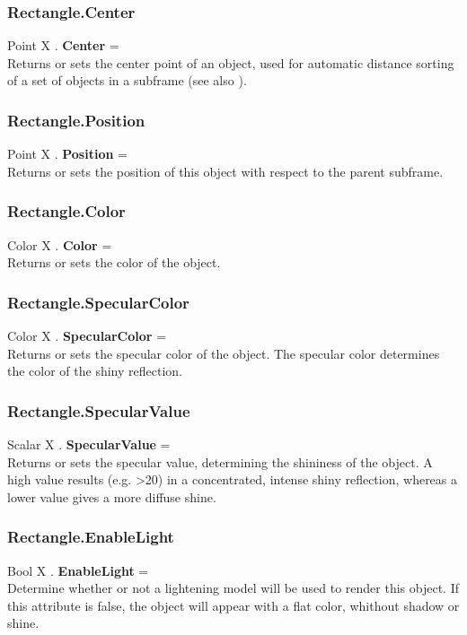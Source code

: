 \subsubsection{Rectangle.Center \label{F:Rectangle:Center}}
Point X . \textbf{Center} = \\
Returns or sets the center point of an object, used for automatic distance sorting of a set of objects in a subframe (see also ).

\subsubsection{Rectangle.Position \label{F:Rectangle:Position}}
Point X . \textbf{Position} = \\
Returns or sets the position of this object with respect to the parent subframe.

\subsubsection{Rectangle.Color \label{F:Rectangle:Color}}
Color X . \textbf{Color} = \\
Returns or sets the color of the object.

\subsubsection{Rectangle.SpecularColor \label{F:Rectangle:SpecularColor}}
Color X . \textbf{SpecularColor} = \\
Returns or sets the specular color of the object. The specular color determines the color of the shiny reflection.

\subsubsection{Rectangle.SpecularValue \label{F:Rectangle:SpecularValue}}
Scalar X . \textbf{SpecularValue} = \\
Returns or sets the specular value, determining the shininess of the object. A high value results (e.g. >20) in a concentrated, intense shiny reflection, whereas a lower value gives a more diffuse shine.

\subsubsection{Rectangle.EnableLight \label{F:Rectangle:EnableLight}}
Bool X . \textbf{EnableLight} = \\
Determine whether or not a lightening model will be used to render this object. If this attribute is false, the object will appear with a flat color, whithout shadow or shine.

